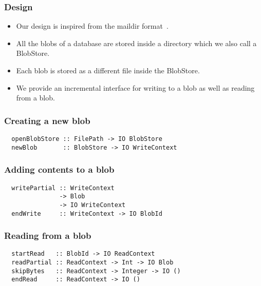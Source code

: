 \documentclass[10pt]{beamer}
\begin{document}
\begin{frame}
  \frametitle{Design}
  \begin{itemize}[<+->]
    \item Our design is inspired from the maildir format~.
    \item All the blobs of a database are stored inside a directory which we also call a \alert{BlobStore}.
    \item Each blob is stored as a different file inside the BlobStore.
    \item We provide an incremental interface for writing to a blob as well as reading from a blob.
  \end{itemize}
\end{frame}

\begin{frame}[fragile]
  \frametitle{Creating a new blob}
  \begin{verbatim}
  openBlobStore :: FilePath -> IO BlobStore
  newBlob       :: BlobStore -> IO WriteContext
  \end{verbatim}
  \vspace{1cm}
  \small
\end{frame}

\begin{frame}[fragile]
  \frametitle{Adding contents to a blob}
  \begin{verbatim}
  writePartial :: WriteContext
               -> Blob
               -> IO WriteContext
  endWrite     :: WriteContext -> IO BlobId
  \end{verbatim}
  \vspace{1cm}
  \small
\end{frame}

\begin{frame}[fragile]
  \frametitle{Reading from a blob}
  \begin{verbatim}
  startRead   :: BlobId -> IO ReadContext
  readPartial :: ReadContext -> Int -> IO Blob
  skipBytes   :: ReadContext -> Integer -> IO ()
  endRead     :: ReadContext -> IO ()
  \end{verbatim}
\end{frame}
\end{document}
